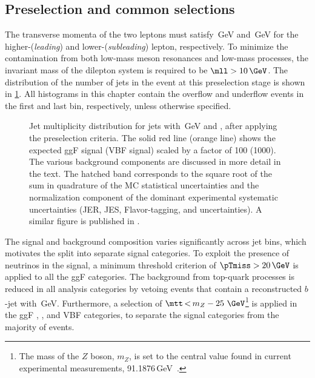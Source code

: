 \subsection{Preselection and common selections}
\label{subsec:preselection}
The transverse momenta of the two leptons must satisfy \,GeV and \,GeV for the higher-\pT (\emph{leading}) and lower-\pT (\emph{subleading}) lepton, respectively.
To minimize the contamination from both low-mass meson resonances and low-mass \Ztautau processes, the invariant mass of the dilepton system is required to be $\mll > 10\,\GeV$.
The distribution of the number of jets in the event at this preselection stage is shown in \cref{fig:njet-dist}.
All histograms in this chapter contain the overflow and underflow events in the first and last bin, respectively, unless otherwise specified.
\begin{figure}
  \caption{Jet multiplicity distribution for jets with \,GeV and , after applying the preselection criteria. The solid red line (orange line) shows the expected ggF signal (VBF signal) scaled by a factor of 100 (1000). The various background components are discussed in more detail in the text. 
  The hatched band corresponds to the square root of the sum in quadrature of the MC statistical uncertainties and the normalization component of the dominant experimental systematic uncertainties (JER, JES, Flavor-tagging, and \MET uncertainties). 
  A similar figure is published in .}
  \label{fig:njet-dist}
\end{figure}
The signal and background composition varies significantly across jet bins, which motivates the split into separate \Njet signal categories.
To exploit the presence of neutrinos in the signal, a minimum threshold criterion of $\pTmiss > 20\,\GeV$ is applied to all the ggF categories.
The background from top-quark processes is reduced in all analysis categories by vetoing events that contain a reconstructed $b$-jet with \,GeV.
Furthermore, a selection of $\mtt\,{<}\,m_Z - 25~\GeV$\footnote{The mass of the $Z$ boson, $m_Z$, is set to the central value found in current experimental measurements, 91.1876\,GeV~\cite{PDG2020}.} is applied in the ggF \OneJet, \TwoJet, and VBF \TwoJet categories, to separate the signal categories from the majority of \Zgamma events.

